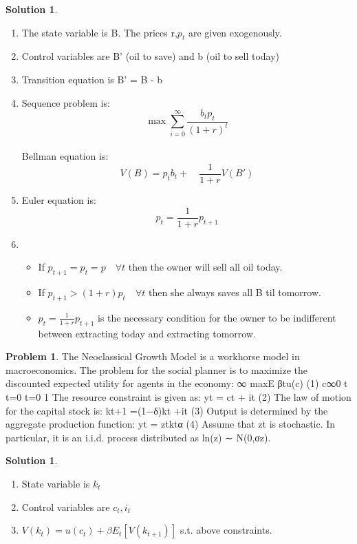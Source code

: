 \documentclass[letterpaper,12pt]{article}
\theoremstyle{definition}
\newtheorem{problem}[theorem]{Problem}
\newtheorem{solution}[theorem]{Solution}
\begin{document}
\begin{solution} ~\\
  \begin{enumerate}
  \item The state variable is B. The prices r,$p_t$ are given exogenously.
  \item Control variables are B' (oil to save) and b (oil to sell today)
  \item Transition equation is B' = B - b
  \item Sequence problem is: \[ \max \sum_{i=0}^\infty \frac{b_tp_t}{(1+r)^t} \] \\
  Bellman equation is:
  \[ V(B) = p_tb_t + \quad \frac{1}{1+r} V(B')\]
  \item Euler equation is: \[ p_t = \frac{1}{1+r}p_{t+1}
  \]
  \item
  \begin{itemize}
    \item If $p_{t+1}=p_t=p \quad \forall t$ then the owner will sell all oil today.
    \item If $p_{t+1} > (1+r) p_t \quad \forall t$ then she always saves all B til tomorrow.
    \item $p_t = \frac{1}{1+r}p_{t+1}$ is the necessary condition for the owner to be indifferent between extracting today and extracting tomorrow.
  \end{itemize}
  \end{enumerate}
\end{solution}

\begin{problem}
The Neoclassical Growth Model is a workhorse model in macroeconomics. The problem for the social planner is to maximize the discounted expected utility for agents in the economy:
∞
 maxE  βtu(c) (1) {c}∞0 t
t=0 t=0 1
The resource constraint is given as:
yt = ct + it (2) The law of motion for the capital stock is:
kt+1 =(1−δ)kt +it (3) Output is determined by the aggregate production function:
yt = ztktα (4) Assume that zt is stochastic. In particular, it is an i.i.d. process distributed as ln(z) ∼
N(0,σz).
\end{problem}

\begin{solution} ~\\
\begin{enumerate}
\item State variable is $k_t$
\item Control variables are $c_t,i_t$
\item $V(k_t) = u(c_t) + \beta E_t[V(k_{t+1})]$ s.t. above constraints.
\end{enumerate}
\end{solution}
\end{document}
